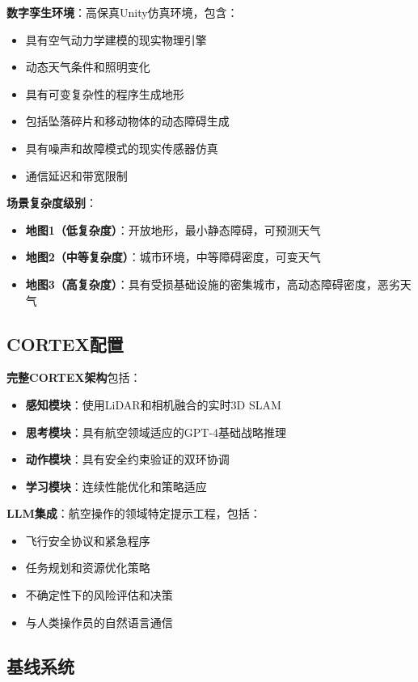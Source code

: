 \textbf{数字孪生环境}：高保真Unity仿真环境，包含：
\begin{itemize}
\item 具有空气动力学建模的现实物理引擎
\item 动态天气条件和照明变化
\item 具有可变复杂性的程序生成地形
\item 包括坠落碎片和移动物体的动态障碍生成
\item 具有噪声和故障模式的现实传感器仿真
\item 通信延迟和带宽限制
\end{itemize}

\textbf{场景复杂度级别}：
\begin{itemize}
\item \textbf{地图1（低复杂度）}：开放地形，最小静态障碍，可预测天气
\item \textbf{地图2（中等复杂度）}：城市环境，中等障碍密度，可变天气
\item \textbf{地图3（高复杂度）}：具有受损基础设施的密集城市，高动态障碍密度，恶劣天气
\end{itemize}

\subsection{CORTEX配置}

\textbf{完整CORTEX架构}包括：
\begin{itemize}
\item \textbf{感知模块}：使用LiDAR和相机融合的实时3D SLAM
\item \textbf{思考模块}：具有航空领域适应的GPT-4基础战略推理
\item \textbf{动作模块}：具有安全约束验证的双环协调
\item \textbf{学习模块}：连续性能优化和策略适应
\end{itemize}

\textbf{LLM集成}：航空操作的领域特定提示工程，包括：
\begin{itemize}
\item 飞行安全协议和紧急程序
\item 任务规划和资源优化策略
\item 不确定性下的风险评估和决策
\item 与人类操作员的自然语言通信
\end{itemize}

\subsection{基线系统}

